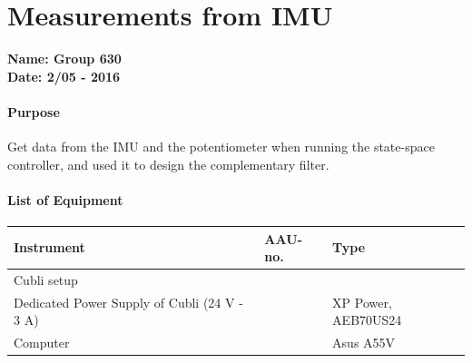 \chapter{Measurements from IMU}\label{app:IMUMeasurementsAppendix}
\textbf{Name: Group 630}\\
\textbf{Date: 2/05 - 2016}

\subsubsection{Purpose}
Get data from the IMU and the potentiometer when running the state-space controller, and used it to design the complementary filter.             

\subsubsection{List of Equipment}
\begin{table}[H]
	\begin{tabular}{|l|l|p{4.3cm}|}
		\hline%
		\textbf{Instrument}                        &  \textbf{AAU-no.}  &  \textbf{Type}       \\
		\hline%
		Cubli setup                              &               &  		  \\
		\hline%
		Dedicated Power Supply of Cubli \small{(24 V - 3 A)} &               &  XP Power, AEB70US24 \\
		\hline%
		Computer                &              &  Asus A55V          \\
		\hline%
	\end{tabular}
\end{table}

